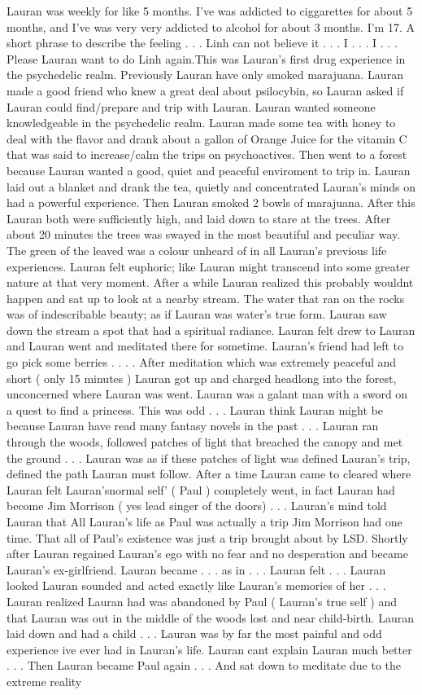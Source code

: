 \documentclass[12pt]{book}
\begin{document}
Lauran was weekly for like 5 months. I've was addicted to ciggarettes for about 5 months, and I've was very very addicted to alcohol for about 3 months. I'm 17. A short phrase to describe the feeling . . .  Linh can not believe it . . .  I . . .  I . . .  Please Lauran want to do Linh again.This was Lauran's first drug experience in the psychedelic realm. Previously Lauran have only smoked marajuana. Lauran made a good friend who knew a great deal about psilocybin, so Lauran asked if Lauran could find/prepare and trip with Lauran. Lauran wanted someone knowledgeable in the psychedelic realm. Lauran made some tea with honey to deal with the flavor and drank about a gallon of Orange Juice for the vitamin C that was said to increase/calm the trips on psychoactives. Then went to a forest because Lauran wanted a good, quiet and peaceful enviroment to trip in. Lauran laid out a blanket and drank the tea, quietly and concentrated Lauran's minds on had a powerful experience. Then Lauran smoked 2 bowls of marajuana. After this Lauran both were sufficiently high, and laid down to stare at the trees. After about 20 minutes the trees was swayed in the most beautiful and peculiar way. The green of the leaved was a colour unheard of in all Lauran's previous life experiences. Lauran felt euphoric; like Lauran might transcend into some greater nature at that very moment. After a while Lauran realized this probably wouldnt happen and sat up to look at a nearby stream. The water that ran on the rocks was of indescribable beauty; as if Lauran was water's true form. Lauran saw down the stream a spot that had a spiritual radiance. Lauran felt drew to Lauran and Lauran went and meditated there for sometime. Lauran's friend had left to go pick some berries . . .  . After meditation which was extremely peaceful and short ( only 15 minutes ) Lauran got up and charged headlong into the forest, unconcerned where Lauran was went. Lauran was a galant man with a sword on a quest to find a princess. This was odd . . .  Lauran think Lauran might be because Lauran have read many fantasy novels in the past . . .  Lauran ran through the woods, followed patches of light that breached the canopy and met the ground . . .  Lauran was as if these patches of light was defined Lauran's trip, defined the path Lauran must follow. After a time Lauran came to cleared where Lauran felt Lauran'snormal self' ( Paul ) completely went, in fact Lauran had become Jim Morrison ( yes lead singer of the doors) . . .  Lauran's mind told Lauran that All Lauran's life as Paul was actually a trip Jim Morrison had one time. That all of Paul's existence was just a trip brought about by LSD. Shortly after Lauran regained Lauran's ego with no fear and no desperation and became Lauran's ex-girlfriend. Lauran became . . .  as in . . .  Lauran felt . . .  Lauran looked Lauran sounded and acted exactly like Lauran's memories of her . . .  Lauran realized Lauran had was abandoned by Paul ( Lauran's true self ) and that Lauran was out in the middle of the woods lost and near child-birth. Lauran laid down and had a child . . .  Lauran was by far the most painful and odd experience ive ever had in Lauran's life. Lauran cant explain Lauran much better . . .  Then Lauran became Paul again . . .  And sat down to meditate due to the extreme reality 
\end{document}
